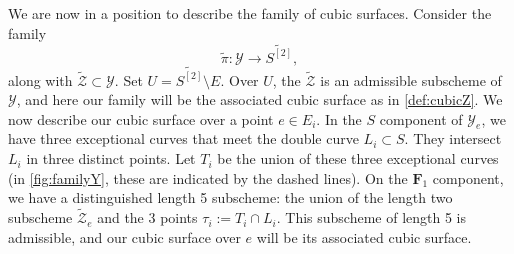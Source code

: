 \documentclass[11pt,reqno, letterpaper]{amsart}
\renewcommand{\to}{{\longrightarrow}}
\numberwithin{equation}{section}
\newcommand{\F}{\mathbf F}
\begin{document}
We are now in a position to describe the family of cubic surfaces.
Consider the family
\[ \widetilde \pi \colon \mathcal Y \to \widetilde{S^{[2]}},\]
along with $\widetilde {\mathcal Z} \subset \mathcal Y$.
Set $U = \widetilde{S^{[2]}} \setminus E$.
Over $U$, the $\widetilde{\mathcal Z}$ is an admissible subscheme of $\mathcal Y$, and here our family will be the associated cubic surface as in \autoref{def:cubicZ}.
We now describe our cubic surface over a point $e \in E_i$.
In the $S$ component of $\mathcal Y_e$, we have three exceptional curves that meet the double curve $L_i \subset S$.
They intersect $L_i$ in three distinct points.
Let $T_i$ be the union of these three exceptional curves (in \autoref{fig:familyY}, these are indicated by the dashed lines).
On the $\F_1$ component, we have a distinguished length 5 subscheme: the union of the length two subscheme $\widetilde{\mathcal Z}_e$ and the 3 points $\tau_i := T_i \cap L_i$.
This subscheme of length 5 is admissible, and our cubic surface over $e$ will be its associated cubic surface.
\end{document}
